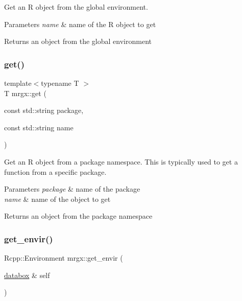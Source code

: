 Get an R object from the global environment.


\begin{DoxyParams}{Parameters}
{\em name} & name of the R object to get \\
\hline
\end{DoxyParams}
\begin{DoxyReturn}{Returns}
an object from the global environment 
\end{DoxyReturn}
\mbox{\label{group__mrgx_ga941a4a510630bc60e9963ddc18cfebdf}} 
\subsubsection{\texorpdfstring{get()}{get()}\hspace{0.1cm}{\footnotesize\ttfamily [3/3]}}
{\footnotesize\ttfamily template$<$typename T $>$ \\
T mrgx\+::get (\begin{DoxyParamCaption}\item[{const std\+::string}]{package,  }\item[{const std\+::string}]{name }\end{DoxyParamCaption})}

Get an R object from a package namespace. This is typically used to get a function from a specific package.


\begin{DoxyParams}{Parameters}
{\em package} & name of the package \\
\hline
{\em name} & name of the object to get \\
\hline
\end{DoxyParams}
\begin{DoxyReturn}{Returns}
an object from the package namespace 
\end{DoxyReturn}
\mbox{\label{group__mrgx_gac0f9d86256f3cb47f9ae798d63c99977}} 
\subsubsection{\texorpdfstring{get\+\_\+envir()}{get\_envir()}}
{\footnotesize\ttfamily Rcpp\+::\+Environment mrgx\+::get\+\_\+envir (\begin{DoxyParamCaption}\item[{\hyperlink{structdatabox}{databox} \&}]{self }\end{DoxyParamCaption})}



